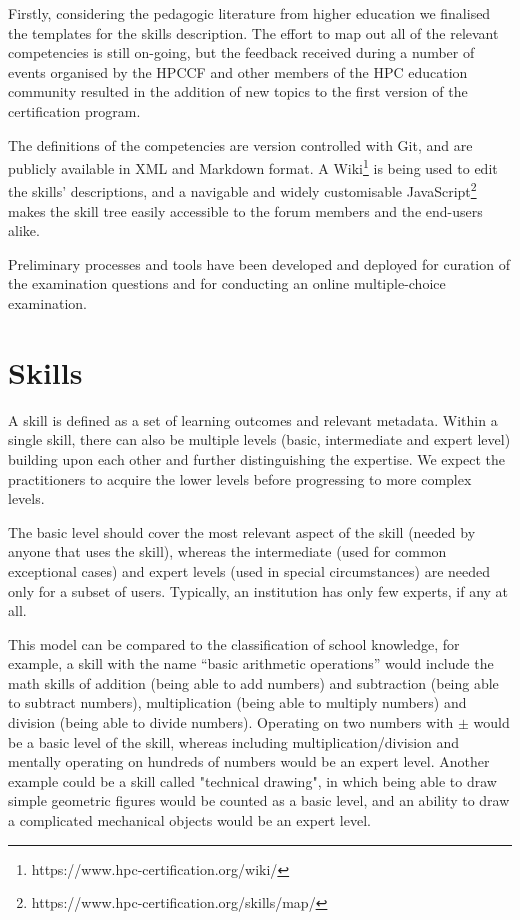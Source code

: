 \documentclass[jocse]{jocseart}
\begin{document}
Firstly, considering the pedagogic literature from higher education we finalised the templates for the skills description.
The effort to map out all of the relevant competencies is still on-going, but the feedback received during a number of events organised by the HPCCF and other members of the HPC education community resulted in the addition of new topics to the first version of the certification program.

The definitions of the competencies are version controlled with Git, and are publicly available in XML and Markdown format.
A Wiki\footnote{https://www.hpc-certification.org/wiki/} is being used to edit the skills' descriptions, and a navigable and widely customisable JavaScript\footnote{https://www.hpc-certification.org/skills/map/} makes the skill tree easily accessible to the forum members and the end-users alike.

Preliminary processes and tools have been developed and deployed for curation of the examination questions and for conducting an online multiple-choice examination.

\section{Skills}
\label{sec:skills}

A skill is defined as a set of learning outcomes and relevant metadata.
Within a single skill, there can also be multiple levels (basic, intermediate and expert level) building upon each other and further distinguishing the expertise.
We expect the practitioners to acquire the lower levels before progressing to more complex levels.

The basic level should cover the most relevant aspect of the skill (needed by anyone that uses the skill), whereas the intermediate (used for common exceptional cases) and expert levels (used in special circumstances)  are needed only for a subset of users.
Typically, an institution has only few experts, if any at all.

This model can be compared to the classification of school knowledge, for example, a skill with the name “basic arithmetic operations” would include the math skills of addition (being able to add numbers) and subtraction (being able to subtract numbers), multiplication (being able to multiply numbers) and division (being able to divide numbers).
Operating on two numbers with $\pm$ would be a basic level of the skill, whereas including multiplication/division and mentally operating on hundreds of numbers would be an expert level.
Another example could be a skill called "technical drawing", in which being able to draw simple geometric figures would be counted as a basic level, and an ability to draw a complicated mechanical objects would be an expert level.
\end{document}
